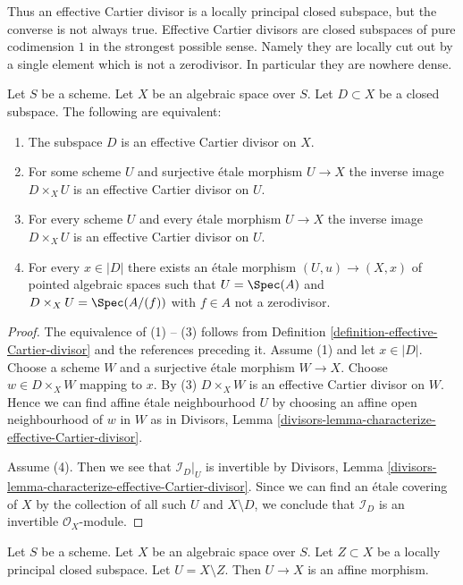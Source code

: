 \noindent
Thus an effective Cartier divisor is a locally principal closed subspace,
but the converse is not always true. Effective Cartier divisors are closed
subspaces of pure codimension $1$ in the strongest possible sense. Namely
they are locally cut out by a single element which is not a zerodivisor.
In particular they are nowhere dense.

\begin{lemma}
\label{lemma-characterize-effective-Cartier-divisor}
Let $S$ be a scheme. Let $X$ be an algebraic space over $S$.
Let $D \subset X$ be a closed subspace.
The following are equivalent:
\begin{enumerate}
\item The subspace $D$ is an effective Cartier divisor on $X$.
\item For some scheme $U$ and surjective \'etale morphism $U \to X$
the inverse image $D \times_X U$ is an effective Cartier divisor on $U$.
\item For every scheme $U$ and every \'etale morphism $U \to X$
the inverse image $D \times_X U$ is an effective Cartier divisor on $U$.
\item For every $x \in |D|$ there exists an \'etale morphism
$(U, u) \to (X, x)$ of pointed algebraic spaces such that $U = \Spec(A)$
and $D \times_X U = \Spec(A/(f))$ with $f \in A$ not a zerodivisor.
\end{enumerate}
\end{lemma}

\begin{proof}
The equivalence of (1) -- (3) follows from
Definition \ref{definition-effective-Cartier-divisor}
and the references preceding it.
Assume (1) and let $x \in |D|$. Choose a scheme $W$ and a
surjective \'etale morphism
$W \to X$. Choose $w \in D \times_X W$ mapping to $x$.
By (3) $D \times_X W$ is an effective Cartier
divisor on $W$. Hence we can find affine \'etale neighbourhood $U$
by choosing an affine open neighbourhood of $w$ in $W$ as in
Divisors, Lemma \ref{divisors-lemma-characterize-effective-Cartier-divisor}.

\medskip\noindent
Assume (4). Then we see that $\mathcal{I}_D|_U$ is invertible by
Divisors, Lemma \ref{divisors-lemma-characterize-effective-Cartier-divisor}.
Since we can find an \'etale covering of $X$ by the collection of
all such $U$ and $X \setminus D$, we conclude that
$\mathcal{I}_D$ is an invertible $\mathcal{O}_X$-module.
\end{proof}

\begin{lemma}
\label{lemma-complement-locally-principal-closed-subscheme}
Let $S$ be a scheme. Let $X$ be an algebraic space over $S$.
Let $Z \subset X$ be a locally principal closed
subspace. Let $U = X \setminus Z$. Then $U \to X$ is an affine morphism.
\end{lemma}

